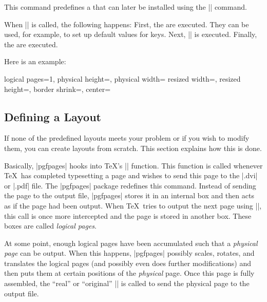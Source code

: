 \begin{command}{\pgfpagesdeclarelayout{}}
    This command predefines a  that can later be installed using
    the |\pgfpagesuselayout| command.

    When |\pgfpagesuselayout| is called, the
    following happens: First, the  are executed. They can
    be used, for example, to set up default values for keys. Next,
    || is executed. Finally, the
     are executed.

    Here is an example:
\begin{codeexample}
{
  \def\pgfpageoptionborder{0pt}
}
{
  \pgfpagesphysicalpageoptions
  {%
    logical pages=1,%
    physical height=\pgfpageoptionheight,%
    physical width=\pgfpageoptionwidth%
  }
  {%
    resized width=\pgfphysicalwidth,%
    resized height=\pgfphysicalheight,%
    border shrink=\pgfpageoptionborder,%
    center=\pgfpoint{.5\pgfphysicalwidth}{.5\pgfphysicalheight}%
  }%
}
\end{codeexample}
\end{command}


\subsection{Defining a Layout}

If none of the predefined layouts meets your problem or if you wish to modify
them, you can create layouts from scratch. This section explains how this is
done.

Basically, |pgfpages| hooks into \TeX's |\shipout| function. This function is
called whenever \TeX\ has completed typesetting a page and wishes to send this
page to the |.dvi| or |.pdf| file. The |pgfpages| package redefines this
command. Instead of sending the page to the output file, |pgfpages| stores it
in an internal box and then acts as if the page had been output. When \TeX\
tries to output the next page using |\shipout|, this call is once more
intercepted and the page is stored in another box. These boxes are called
\emph{logical pages}.

At some point, enough logical pages have been accumulated such that a
\emph{physical page} can be output. When this happens, |pgfpages| possibly
scales, rotates, and translates the logical pages (and possibly even does
further modifications) and then puts them at certain positions of the
\emph{physical} page. Once this page is fully assembled, the ``real'' or
``original'' |\shipout| is called to send the physical page to the output file.

